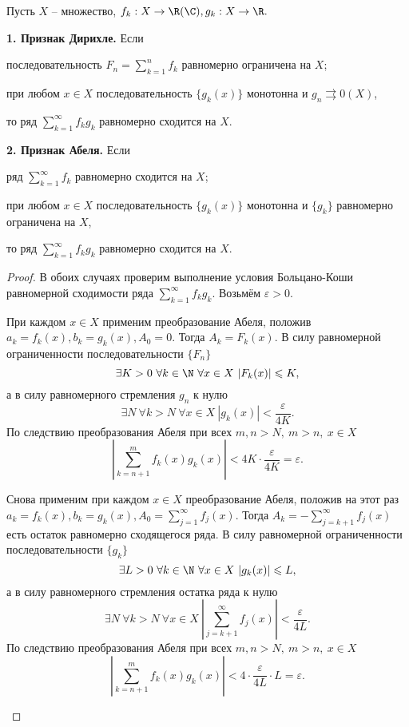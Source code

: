 \begin{Thm}
    Пусть $X$ -- множество, $f_k : X \to \R (\C), g_k : X \to \R.$

    \textbf{1. Признак Дирихле.} Если
    \begin{MyList}
        \item последовательность $F_n = \displaystyle \sum_{k = 1}^{n} f_k$ равномерно ограничена на $X$;
        \item при любом $x \in X$ последовательность $\{g_k(x)\}$ монотонна и $g_n \rightrightarrows 0 (X)$,
    \end{MyList} 
    то ряд $\displaystyle \sum_{k = 1}^{\infty}f_k g_k$ равномерно сходится на $X$. 

    \textbf{2. Признак Абеля.} Если
    \begin{MyList}
        \item ряд $\displaystyle \sum_{k = 1}^{\infty} f_k$ равномерно сходится на $X$;
        \item при любом $x \in X$ последовательность $\{g_k (x) \}$ монотонна и $\{g_k\}$ равномерно ограничена на $X$, 
    \end{MyList} 
    то ряд $\displaystyle \sum_{k = 1}^{\infty} f_k g_k$ равномерно сходится на $X$. 
\end{Thm}

\begin{proof}
    В обоих случаях проверим выполнение условия Больцано-Коши равномерной сходимости ряда $\displaystyle \sum_{k = 1}^{\infty} f_k g_k$. Возьмём $\varepsilon > 0$.
    \begin{MyList}
        \item При каждом $x \in X$ применим преобразование Абеля, положив $a_k = f_k (x), b_k = g_k (x), A_0 = 0$. Тогда $A_k = F_k(x)$. В силу равномерной ограниченности последовательности $\{ F_n\}$ 
        $$\exists K > 0 \ \forall k \in \N \ \forall x \in X \ |F_k (x)| \leqslant K,$$
        а в силу равномерного стремления $g_n$ к нулю
        \[\exists N \ \forall k > N \ \forall x \in X \ |g_k(x)| < \frac{\varepsilon}{4K}.\]
        По следствию преобразования Абеля при всех $m, n > N, \ m > n, \ x \in X$
        \[ \left|\sum_{k = n + 1}^{m} f_k(x)g_k(x) \right| < 4K \cdot \frac{\varepsilon}{4K} =  \varepsilon.\]
        \item Снова применим при каждом $x \in X$ преобразование Абеля, положив на этот раз $a_k = f_k(x), b_k = g_k(x), A_0 = \displaystyle \sum_{j = 1}^{\infty} f_j (x)$.
        Тогда $A_k = - \displaystyle \sum_{j = k + 1}^{\infty} f_j (x)$ есть остаток равномерно сходящегося ряда. В силу равномерной ограниченности последовательности $\{ g_k \}$
        \[ \exists L > 0  \ \forall k \in \N \ \forall x \in X \ |g_k(x)| \leqslant L,\]
        а в силу равномерного стремления остатка ряда к нулю
        \[ \exists N \ \forall k > N \ \forall x \in X \ \left|\sum_{j = k + 1}^{\infty} f_j (x)\right| < \frac{\varepsilon}{4L}.\]
        По следствию преобразования Абеля при всех $m, n > N, \ m > n, \ x \in X$
        \[ \left|\sum_{k = n + 1}^{m} f_k(x) g_k (x) \right| < 4 \cdot \frac{\varepsilon}{4L} \cdot L = \varepsilon.\]
    \end{MyList}
\end{proof}

